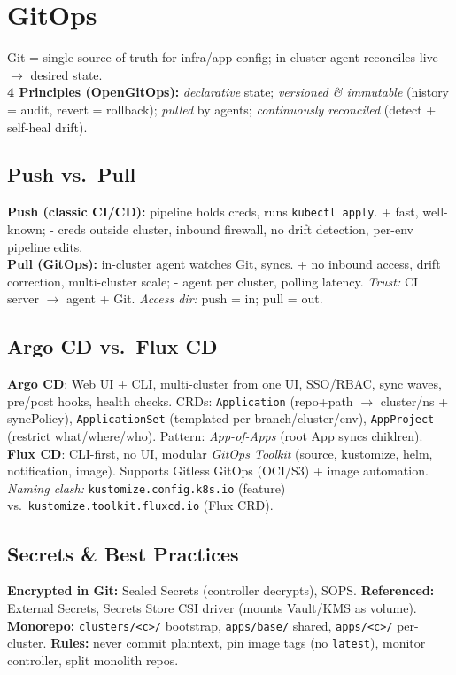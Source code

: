 \renewcommand{\chapcolor}{chGitops}
\section{GitOps}
Git = single source of truth for infra/app config; in-cluster agent reconciles live $\rightarrow$ desired state. \\
\textbf{4 Principles (OpenGitOps):} \textit{declarative} state; \textit{versioned \& immutable} (history = audit, revert = rollback); \textit{pulled} by agents; \textit{continuously reconciled} (detect + self-heal drift).

\subsection{Push vs.\ Pull}
\textbf{Push (classic CI/CD):} pipeline holds creds, runs \texttt{kubectl apply}. + fast, well-known; - creds outside cluster, inbound firewall, no drift detection, per-env pipeline edits. \\
\textbf{Pull (GitOps):} in-cluster agent watches Git, syncs. + no inbound access, drift correction, multi-cluster scale; - agent per cluster, polling latency. \textit{Trust:} CI server $\rightarrow$ agent + Git. \textit{Access dir:} push = in; pull = out.

\subsection{Argo CD vs.\ Flux CD}
\textbf{Argo CD}: Web UI + CLI, multi-cluster from one UI, SSO/RBAC, sync waves, pre/post hooks, health checks. CRDs: \texttt{Application} (repo+path $\rightarrow$ cluster/ns + syncPolicy), \texttt{ApplicationSet} (templated per branch/cluster/env), \texttt{AppProject} (restrict what/where/who). Pattern: \textit{App-of-Apps} (root App syncs children). \\
\textbf{Flux CD}: CLI-first, no UI, modular \textit{GitOps Toolkit} (source, kustomize, helm, notification, image). Supports Gitless GitOps (OCI/S3) + image automation. \textit{Naming clash:} \texttt{kustomize.config.k8s.io} (feature) vs.\ \texttt{kustomize.toolkit.fluxcd.io} (Flux CRD).

\subsection{Secrets \& Best Practices}
\textbf{Encrypted in Git:} Sealed Secrets (controller decrypts), SOPS. \textbf{Referenced:} External Secrets, Secrets Store CSI driver (mounts Vault/KMS as volume). \\
\textbf{Monorepo:} \texttt{clusters/<c>/} bootstrap, \texttt{apps/base/} shared, \texttt{apps/<c>/} per-cluster. \textbf{Rules:} never commit plaintext, pin image tags (no \texttt{latest}), monitor controller, split monolith repos.
